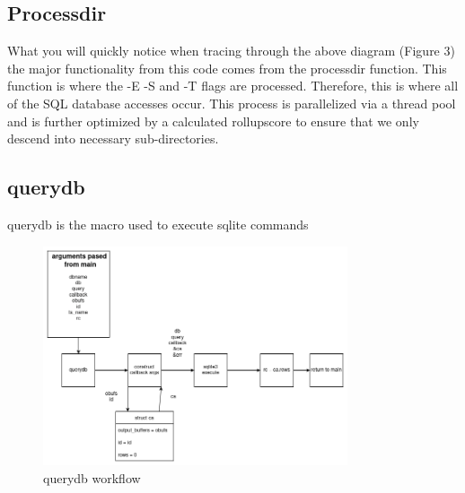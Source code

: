 \subsection{Processdir}
What you will quickly notice when tracing through the above diagram (Figure 3) the major functionality from this code comes from the processdir function. This function is where the -E -S and -T flags are processed. Therefore, this is where all of the SQL database accesses occur. This process is parallelized via a thread pool and is further optimized by a calculated rollupscore to ensure that we only descend into necessary sub-directories.

\subsection{querydb}
querydb is the macro used to execute sqlite commands


\begin{figure} [h]
\centering
\includegraphics[width=0.8\textwidth]{images/querydb.png}
\caption{\label{fig:querydb}querydb workflow}
\end{figure}


\clearpage